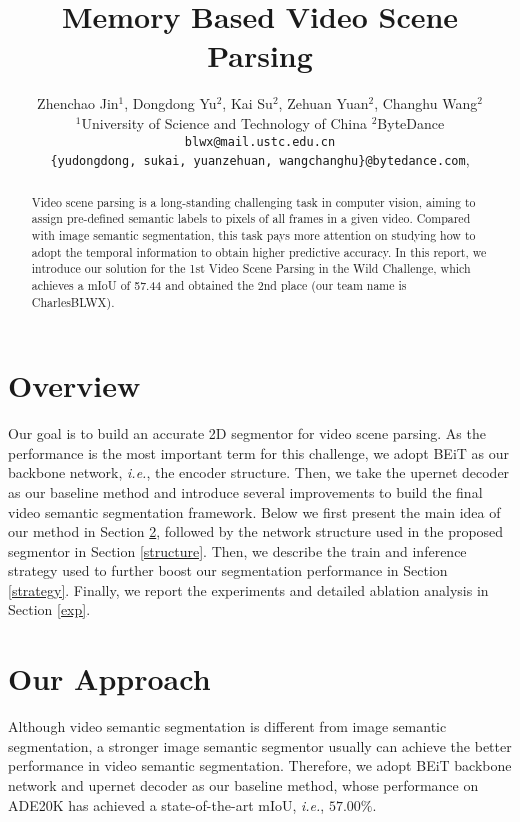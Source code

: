 \documentclass[10pt,twocolumn,letterpaper]{article}
\begin{document}
\title{Memory Based Video Scene Parsing}

\author{Zhenchao Jin$^{1}$, Dongdong Yu$^{2}$, Kai Su$^{2}$, Zehuan Yuan$^{2}$, Changhu Wang$^{2}$\\
$^{1}$University of Science and Technology of China \quad 
$^{2}$ByteDance \\
{\tt\small blwx@mail.ustc.edu.cn} \\
{\tt\small \{yudongdong, sukai, yuanzehuan, wangchanghu\}@bytedance.com},
}

\maketitle
\ificcvfinal\thispagestyle{empty}\fi

\begin{abstract}
   Video scene parsing is a long-standing challenging task in computer vision, aiming to assign pre-defined semantic labels to pixels of all frames in a given video.
   Compared with image semantic segmentation, this task pays more attention on studying how to adopt the temporal information to obtain higher predictive accuracy.
   In this report, we introduce our solution for the 1st Video Scene Parsing in the Wild Challenge, which achieves a mIoU of 57.44 and obtained the 2nd place (our team name is CharlesBLWX).
\end{abstract}

\section{Overview}
Our goal is to build an accurate 2D segmentor for video scene parsing.
As the performance is the most important term for this challenge, we adopt BEiT \cite{bao2021beit} as our backbone network, \emph{i.e.}, the encoder structure.
Then, we take the upernet decoder \cite{xiao2018unified} as our baseline method and introduce several improvements to build the final video semantic segmentation framework.
Below we first present the main idea of our method in Section \ref{approach},
followed by the network structure used in the proposed segmentor in Section \ref{structure}.
Then, we describe the train and inference strategy used to further boost our segmentation performance in Section \ref{strategy}.
Finally, we report the experiments and detailed ablation analysis in Section \ref{exp}.


\section{Our Approach} \label{approach}
Although video semantic segmentation is different from image semantic segmentation, 
a stronger image semantic segmentor usually can achieve the better performance in video semantic segmentation.
Therefore, we adopt BEiT backbone network \cite{bao2021beit} and upernet decoder \cite{xiao2018unified} as our baseline method, whose performance on ADE20K \cite{zhou2017scene} has achieved a state-of-the-art mIoU, \emph{i.e.}, $57.00\%$.
\end{document}
